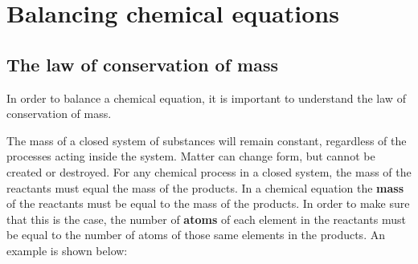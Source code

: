   \label{m38721**end}
         \section{Balancing chemical equations}
    \nopagebreak
      \label{m38726*uid9}
            \subsection*{The law of conservation of mass}
            \nopagebreak
        \label{m38726*id63198}In order to balance a chemical equation, it is important to understand the law of conservation of mass.\par 
\label{m38726*fhsst!!!underscore!!!id145}
 { The mass of a closed system of substances will remain constant, regardless of the processes acting inside the system. Matter can change form, but cannot be created or destroyed. For any chemical process in a closed system, the mass of the reactants must equal the mass of the products. } 
        \label{m38726*id63221}In a chemical equation the \textbf{mass} of the reactants must be equal to the mass of the products. In order to make sure that this is the case, the number of \textbf{atoms} of each element in the reactants must be equal to the number of atoms of those same elements in the products. An example is shown below:\par 
